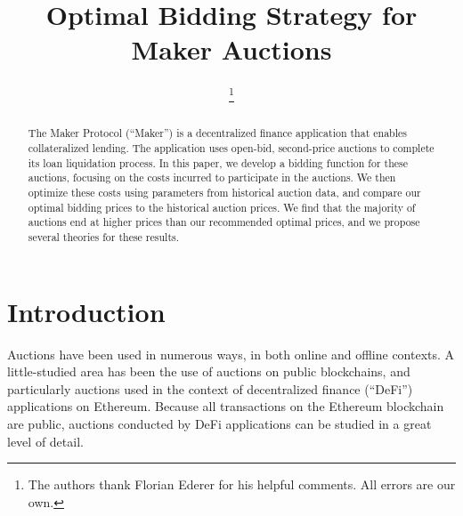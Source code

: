 \documentclass[conference]{IEEEtran}
\begin{document}
\title{Optimal Bidding Strategy for Maker Auctions}

\author{
    \vspace{0.1cm}
    \thanks{The authors thank Florian Ederer for his helpful comments. All errors are our own.}
    \\[-3.5ex]
}

\maketitle
\thispagestyle{plain}
\pagestyle{plain}

\begin{abstract}
The Maker Protocol (``Maker'') is a decentralized finance application that enables collateralized lending. The application uses open-bid, second-price auctions to complete its loan liquidation process. In this paper, we develop a bidding function for these auctions, focusing on the costs incurred to participate in the auctions. We then optimize these costs using parameters from historical auction data, and compare our optimal bidding prices to the historical auction prices. We find that the majority of auctions end at higher prices than our recommended optimal prices, and we propose several theories for these results.
\end{abstract}

\section{Introduction}
Auctions have been used in numerous ways, in both online and offline contexts. A little-studied area has been the use of auctions on public blockchains, and particularly auctions used in the context of decentralized finance (``DeFi'') applications on Ethereum. Because all transactions on the Ethereum blockchain are public, auctions conducted by DeFi applications can be studied in a great level of detail.
\end{document}
